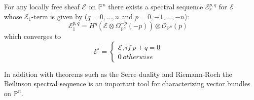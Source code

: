\documentclass[
	oldfontcommands,
	sumario=abnt-6027-2012,
	12pt,			%
	openright,		%
	oneside,		%
	a4paper,		%
	english,		%
	brazil			%
	]{imecc-unicamp}
\begin{document}
\begin{theorem}\cite[Okonek, Schneider \& Spindler, p. 245]{Okonek}\label{beilinson2}
For any locally free sheaf $\mathcal{E}$ on $\mathbb{P}^n$ there exists a spectral sequence {$\mathcal{E}^{p,q}_r$} for $\mathcal{E}$ whose $\mathcal{E}_1$-term is given by ($q=0,...,n$ and $p=0,-1,...,-n$):
\begin{equation}
\mathcal{E}^{p,q}_1=H^q(\mathcal{E}\otimes\Omega^{-p}_{\mathbb{P}^n}(-p)) \otimes \mathcal{O}_{\mathbb{P}^n}(p)
\end{equation}
which converges to 
\begin{equation}
\mathcal{E}^{i} = \begin{cases} \mathcal{E}, if \ p+q=0 \\ 0 \ otherwise
\end{cases}
\end{equation}
\end{theorem}
In addition with theorems such as the Serre duality and Riemann-Roch the Beilinson spectral sequence is an important tool for characterizing vector bundles on $\mathbb{P}^n$.
\end{document}

